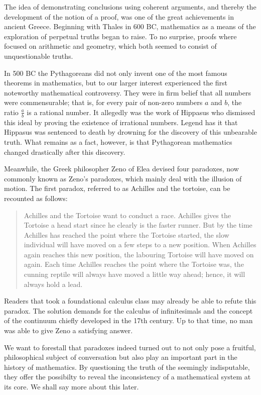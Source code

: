 \documentclass[hidelinks]{article}
\theoremstyle{plain}
\theoremstyle{definition}
\theoremstyle{rem}
\begin{document}
The idea of demonstrating conclusions using coherent arguments, and thereby the development of the notion of a proof, was one of the great achievements in ancient Greece.
Beginning with Thales in 600 BC, mathematics as a means of the exploration of perpetual truths began to raise. To no surprise, proofs where focused on arithmetic and geometry, which both seemed to consist of unquestionable truths.

In 500 BC the Pythagoreans did not only invent one of the most famous theorems in mathematics, but to our larger interest experienced the first noteworthy mathematical controversy. They were in firm belief that all numbers were commensurable; that is, for every pair of non-zero numbers $a$ and $b$, the ratio $\frac{a}{b}$ is a rational number. It allegedly was the work of Hippasus who dismissed this ideal by proving the existence of irrational numbers. Legend has it that Hippasus was sentenced to death by drowning for the discovery of this unbearable truth. What remains as a fact, however, is that Pythagorean mathematics changed drastically after this discovery.

Meanwhile, the Greek philosopher Zeno of Elea devised four paradoxes, now commonly known as Zeno's paradoxes, which mainly deal with the illusion of motion. The first paradox, referred to as Achilles and the tortoise, can be recounted as follows:
\begin{quote}\label{zeno_paradox}
Achilles and the Tortoise want to conduct a race. Achilles gives the Tortoise a head start since he clearly is the faster runner. But by the time Achilles has reached the point where the Tortoise started, the slow individual will have moved on a few steps to a new position. When Achilles again reaches this new position, the labouring Tortoise will have moved on again. Each time Achilles reaches the point where the Tortoise was, the cunning reptile will always have moved a little way ahead; hence, it will always hold a lead.
\end{quote}
Readers that took a foundational calculus class may already be able to refute this paradox. The solution demands for the calculus of infinitesimals and the concept of the continuum chiefly developed in the 17th century. Up to that time, no man was able to give Zeno a satisfying answer.

We want to forestall that paradoxes indeed turned out to not only pose a fruitful, philosophical subject of conversation but also play an important part in the history of mathematics. By questioning the truth of the seemingly indisputable, they offer the possibilty to reveal the inconsistency of a mathematical system at its core. We shall say more about this later.
\end{document}
